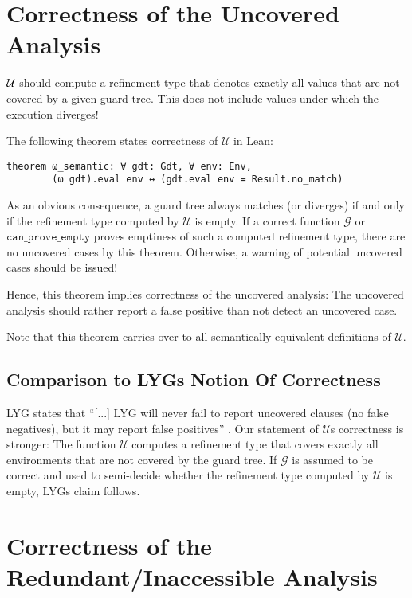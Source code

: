 \section{Correctness of the Uncovered Analysis}
\label{sec:formalizationSemanticU}

$\mathcal{U}$ should compute a refinement type that denotes exactly all values that are not covered by a given guard tree.
This does not include values under which the execution diverges!

The following theorem states correctness of $\mathcal{U}$ in Lean:

\begin{verbatim}
theorem ω_semantic: ∀ gdt: Gdt, ∀ env: Env,
        (ω gdt).eval env ↔ (gdt.eval env = Result.no_match)
\end{verbatim}

As an obvious consequence, a guard tree always matches (or diverges) if and only if the refinement type computed by $\mathcal{U}$ is empty.
If a correct function $\mathcal{G}$ or $\mathtt{can\_prove\_empty}$ proves emptiness of such a computed refinement type, there are no uncovered cases by this theorem. Otherwise, a warning of potential uncovered cases should be issued!

Hence, this theorem implies correctness of the uncovered analysis:
The uncovered analysis should rather report a false positive than not detect an uncovered case.

Note that this theorem carries over to all semantically equivalent definitions of $\mathcal{U}$.

\subsection{Comparison to LYGs Notion Of Correctness}

LYG states that ``[...] LYG will never fail to report uncovered clauses (no false negatives), but it may report false positives'' \cite{10.1145/3408989}.
Our statement of $\mathcal{U}$s correctness is stronger:
The function $\mathcal{U}$ computes a refinement type that covers exactly all environments that are not covered by the guard tree. If $\mathcal{G}$ is assumed to be correct and used to semi-decide whether the refinement type computed by $\mathcal{U}$ is empty,
LYGs claim follows.

\section{Correctness of the Redundant/Inaccessible Analysis}
\label{sec:formalizationSemanticRA}

